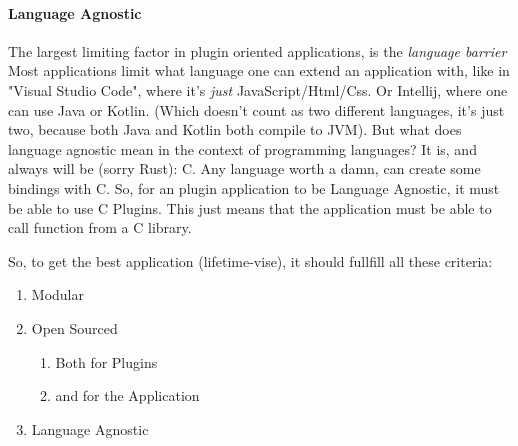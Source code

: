 \paragraph{Language Agnostic} The largest limiting factor in plugin oriented applications, is the \textit{language barrier}
Most applications limit what language one can extend an application with, like in "Visual Studio Code",
where it's \textit{just} JavaScript/Html/Css. Or Intellij, where one can use Java or Kotlin. (Which doesn't count as
two different languages, it's just two, because both Java and Kotlin both compile to JVM). But what does language agnostic
mean in the context of programming languages? It is, and always will be (sorry Rust): C. Any language worth a damn, can
create some bindings with C. So, for an plugin application to be Language Agnostic, it must be able to use C Plugins.
This just means that the application must be able to call function from a C library.

So, to get the best application (lifetime-vise), it should fullfill all these criteria:

\begin{enumerate}
  \item Modular
  \item Open Sourced
    \begin{enumerate}
      \item Both for Plugins
      \item and for the Application
    \end{enumerate}
  \item Language Agnostic
\end{enumerate}



